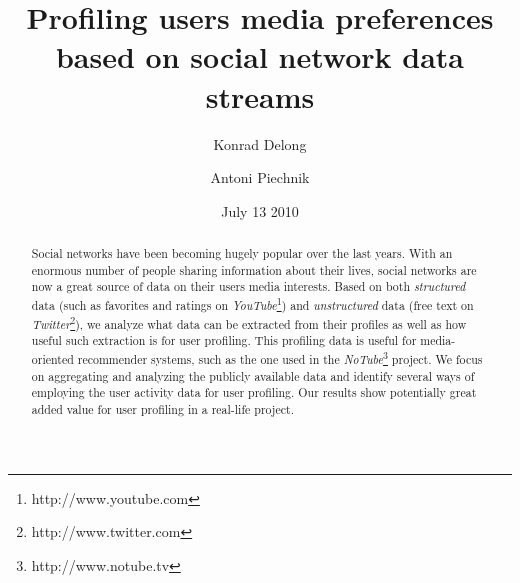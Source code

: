 \documentclass{article}
\begin{document}
\title{\textbf{Profiling users media preferences based on social network data streams}}
\author{Konrad Delong \and Antoni Piechnik}
\date{July 13 2010}

\maketitle

\begin{abstract} Social networks have been becoming hugely popular over the last
years. With an enormous number of people sharing information about their lives,
social networks are now a great source of data on their users media interests. Based on both
\textit{structured} data (such as favorites and ratings on \textit{YouTube}\footnote{http://www.youtube.com})
and \textit{unstructured} data (free text on \textit{Twitter}\footnote{http://www.twitter.com}),
we analyze what data can be extracted from their profiles as well as how useful such extraction
is for user profiling. This profiling data is useful for media-oriented recommender
systems, such as the one used in the \textit{NoTube}\footnote{http://www.notube.tv} project.
We focus on aggregating and analyzing the publicly available data and
identify several ways of employing the user activity data for user profiling.
Our results show potentially great added value for user profiling in a real-life project.
\end{abstract}





















\end{document}
